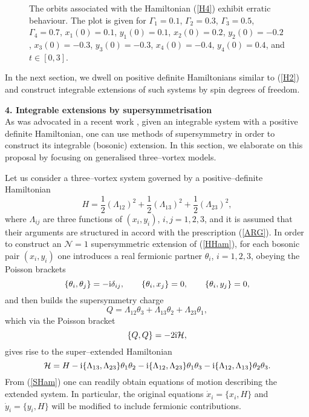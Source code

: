 \documentclass[12pt]{article}
\def\be{\begin{equation}}
\def\ee{\end{equation}}
\begin{document}
\begin{figure}[ht]
\begin{center}
\vskip-4mm
\caption{\small The orbits associated with the Hamiltonian (\ref{H4}) exhibit erratic behaviour. The plot is given for $\Gamma_1=0.1$, $\Gamma_2=0.3$, $\Gamma_3=0.5$, $\Gamma_4=0.7$, $x_1(0)=0.1$, $y_1 (0)=0.1$, $x_2 (0)=0.2$, $y_2 (0)=-0.2$, $x_3 (0)=-0.3$, $y_3 (0)=-0.3$, $x_4 (0)=-0.4$, $y_4 (0)=0.4$, and $t \in [0,3]$.}
\label{fig3}
\end{center}
\end{figure}

In the next section, we dwell on positive definite Hamiltonians similar to (\ref{H2}) and construct integrable extensions of such systems by spin degrees of freedom.

\vspace{0.5cm}

\noindent
{\bf 4. Integrable extensions by supersymmetrisation}\\

\noindent
As was advocated in a recent work \cite{AG}, given an integrable system with a positive definite Hamiltonian, one can use methods of supersymmetry in order to construct its integrable (bosonic) extension. In this section, we elaborate on this proposal by focusing on generalised three--vortex models.

Let us consider a three--vortex system governed by a positive--definite Hamiltonian
\be\label{HHam}
H=\frac 12 {\left(\Lambda_{12}\right)}^2+\frac 12 {\left(\Lambda_{13}\right)}^2+\frac 12 {\left(\Lambda_{23}\right)}^2,
\ee
where $\Lambda_{ij}$ are three functions of $(x_i,y_i)$, $i,j=1,2,3$, and it is assumed that their arguments are structured in accord with the prescription (\ref{ARG}).
In order to construct an $\mathcal{N}=1$ supersymmetric extension of (\ref{HHam}), for each bosonic pair $(x_i,y_i)$ one introduces a real fermionic partner $\theta_i$, $i=1,2,3$, obeying the Poisson brackets
\be\label{PPbr}
\{\theta_i,\theta_j \}=-{\rm i} \delta_{ij}, \qquad \{\theta_i,x_j \}=0, \qquad \{\theta_i,y_j \}=0,
\ee
and then builds the supersymmetry charge
\be\label{sc}
Q=\Lambda_{12} \theta_3+\Lambda_{13} \theta_2+\Lambda_{23} \theta_1,
\ee
which via the Poisson bracket
\be
\{Q,Q \}=-2 {\rm i} \mathcal{H},
\ee
gives rise to the super--extended Hamiltonian
\be\label{SHam}
\mathcal{H}=H-{\rm i} \{\Lambda_{13},\Lambda_{23} \} \theta_1 \theta_2-{\rm i} \{\Lambda_{12},\Lambda_{23} \} \theta_1 \theta_3-{\rm i} \{\Lambda_{12},\Lambda_{13} \} \theta_2 \theta_3.
\ee
From (\ref{SHam}) one can readily obtain equations of motion describing the extended system. In particular, the original equations ${\dot x}_i=\{x_i,H\}$ and ${\dot y}_i=\{y_i,H\}$ will be modified to include fermionic contributions.
\end{document}
